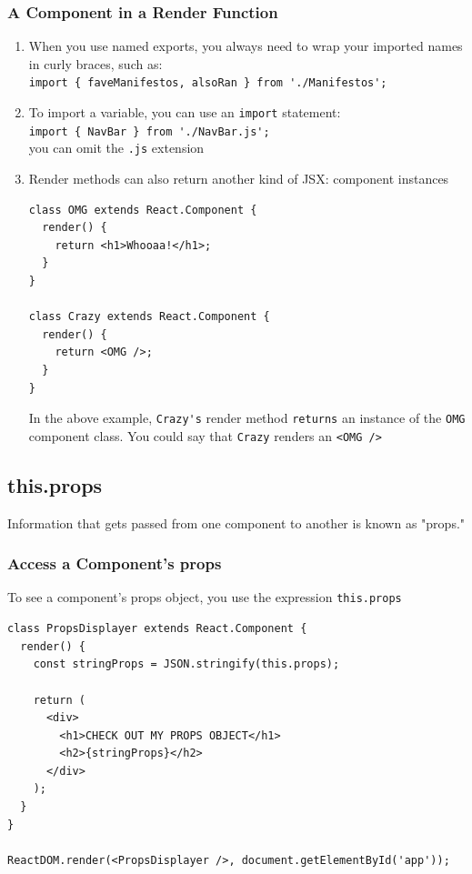 \documentclass[a4paper, 12pt]{article}
\begin{document}
\subsubsection{A Component in a Render Function}
\begin{enumerate}

\item When you use named exports, you always need to wrap your imported names in curly braces, such as:\\
\verb|import { faveManifestos, alsoRan } from './Manifestos';|

\item To import a variable, you can use an \verb|import| statement:\\
\verb|import { NavBar } from './NavBar.js';|\\
you can omit the \verb|.js| extension

\item Render methods can also return another kind of JSX: component instances
\begin{verbatim}
class OMG extends React.Component {
  render() {
    return <h1>Whooaa!</h1>;
  }
}

class Crazy extends React.Component {
  render() {
    return <OMG />;
  }
}
\end{verbatim}
In the above example, \verb|Crazy's| render method \verb|returns| an instance of the \verb|OMG| component class. You could say that \verb|Crazy| renders an \verb|<OMG />|
\end{enumerate}

\subsection{this.props}
Information that gets passed from one component to another is known as "props."

\subsubsection{Access a Component's props}
To see a component's props object, you use the expression \verb|this.props|
\begin{verbatim}
class PropsDisplayer extends React.Component {
  render() {
  	const stringProps = JSON.stringify(this.props);

    return (
      <div>
        <h1>CHECK OUT MY PROPS OBJECT</h1>
        <h2>{stringProps}</h2>
      </div>
    );
  }
}

ReactDOM.render(<PropsDisplayer />, document.getElementById('app'));
\end{verbatim}
\end{document}

